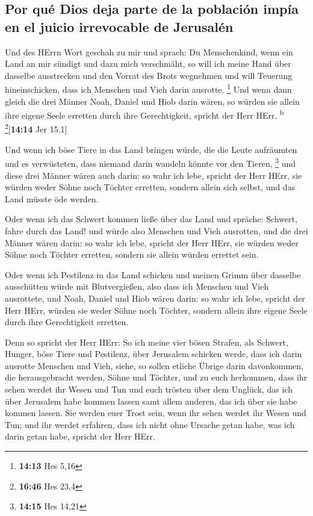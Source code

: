\hypertarget{por-quuxe9-dios-deja-parte-de-la-poblaciuxf3n-impuxeda-en-el-juicio-irrevocable-de-jerusaluxe9n}{%
\subsection{Por qué Dios deja parte de la población impía en el juicio
irrevocable de
Jerusalén}\label{por-quuxe9-dios-deja-parte-de-la-poblaciuxf3n-impuxeda-en-el-juicio-irrevocable-de-jerusaluxe9n}}

 Und des HErrn Wort geschah zu mir und sprach:
 Du Menschenkind, wenn ein Land an mir sündigt und dazu
mich verschmäht, so will ich meine Hand über dasselbe ausstrecken und
den Vorrat des Brots wegnehmen und will Teuerung hineinschicken, dass
ich Menschen und Vieh darin ausrotte. \footnote{\textbf{14:13} Hes 5,16}
 Und wenn dann gleich die drei Männer Noah, Daniel und
Hiob darin wären, so würden sie allein ihre eigene Seele erretten durch
ihre Gerechtigkeit, spricht der Herr HErr. \textsuperscript{b}
\footnote{\textbf{16:46} Hes 23,4}{[}\textbf{14:14} Jer 15,1{]}

 Und wenn ich böse Tiere in das Land bringen würde, die
die Leute aufräumten und es verwüsteten, dass niemand darin wandeln
könnte vor den Tieren, \footnote{\textbf{14:15} Hes 14,21}
 und diese drei Männer wären auch darin: so wahr ich
lebe, spricht der Herr HErr, sie würden weder Söhne noch Töchter
erretten, sondern allein sich selbst, und das Land müsste öde werden.

 Oder wenn ich das Schwert kommen ließe über das Land und
spräche: Schwert, fahre durch das Land! und würde also Menschen und Vieh
ausrotten,  und die drei Männer wären darin: so wahr ich
lebe, spricht der Herr HErr, sie würden weder Söhne noch Töchter
erretten, sondern sie allein würden errettet sein.

 Oder wenn ich Pestilenz in das Land schicken und meinen
Grimm über dasselbe ausschütten würde mit Blutvergießen, also dass ich
Menschen und Vieh ausrottete,  und Noah, Daniel und Hiob
wären darin: so wahr ich lebe, spricht der Herr HErr, würden sie weder
Söhne noch Töchter, sondern allein ihre eigene Seele durch ihre
Gerechtigkeit erretten.

 Denn so spricht der Herr HErr: So ich meine vier bösen
Strafen, als Schwert, Hunger, böse Tiere und Pestilenz, über Jerusalem
schicken werde, dass ich darin ausrotte Menschen und Vieh,
 siehe, so sollen etliche Übrige darin davonkommen, die
herausgebracht werden, Söhne und Töchter, und zu euch herkommen, dass
ihr sehen werdet ihr Wesen und Tun und euch trösten über dem Unglück,
das ich über Jerusalem habe kommen lassen samt allem anderen, das ich
über sie habe kommen lassen.  Sie werden euer Trost sein,
wenn ihr sehen werdet ihr Wesen und Tun; und ihr werdet erfahren, dass
ich nicht ohne Ursache getan habe, was ich darin getan habe, spricht der
Herr HErr.

